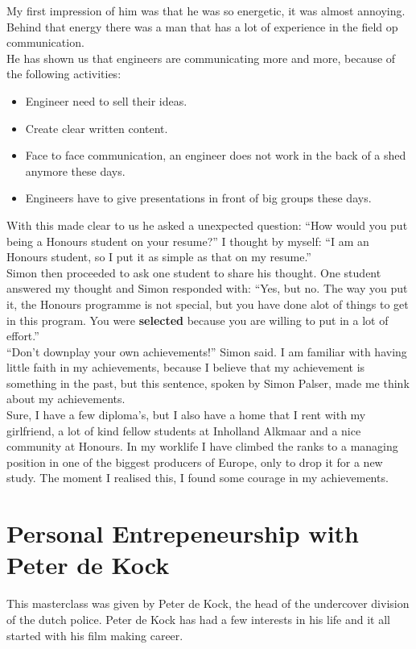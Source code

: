 \documentclass{article}
\begin{document}
My first impression of him was that he was so energetic, it was almost annoying. Behind that energy there was a man that has a lot of experience in the field op communication. \\

He has shown us that engineers are communicating more and more, because of the following activities: 
\begin{itemize}
	\item Engineer need to sell their ideas.
	\item Create clear written content.
	\item Face to face communication, an engineer does not work in the back of a shed anymore these days.
	\item Engineers have to give presentations in front of big groups these days. 
\end{itemize}

With this made clear to us he asked a unexpected question: ``How would you put being a Honours student on your resume?'' I thought by myself: ``I am an Honours student, so I put it as simple as that on my resume.''\\

 Simon then proceeded to ask one student to share his thought. One student answered my thought and Simon responded with: ``Yes, but no. The way you put it, the Honours programme is not special, but you have done alot of things to get in this program. You were \textbf{selected} because you are willing to put in a lot of effort.''\\

``Don't downplay your own achievements!'' Simon said. I am familiar with having little faith in my achievements, because I believe that my achievement is something in the past, but this sentence, spoken by Simon Palser, made me think about my achievements.\\

 Sure, I have a few diploma's, but I also have a home that I rent with my girlfriend, a lot of kind fellow students at Inholland Alkmaar and a nice community at Honours. In my worklife I have climbed the ranks to a managing position in one of the biggest producers of Europe, only to drop it for a new study. The moment I realised this, I found some courage in my achievements.\\
\newpage
\section{Personal Entrepeneurship with Peter de Kock}
This masterclass was given by Peter de Kock, the head of the undercover division of the dutch police. Peter de Kock has had a few interests in his life and it all started with his film making career.
\end{document}
